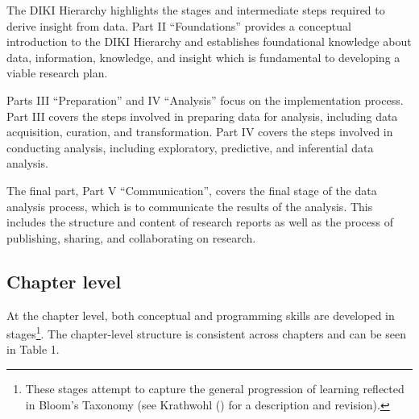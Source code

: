 \documentclass[
  letterpaper,
]{latex/krantz}
\theoremstyle{definition}
\theoremstyle{remark}
\begin{document}
The DIKI Hierarchy highlights the stages and intermediate steps required
to derive insight from data. Part II ``Foundations'' provides a
conceptual introduction to the DIKI Hierarchy and establishes
foundational knowledge about data, information, knowledge, and insight
which is fundamental to developing a viable research plan.

Parts III ``Preparation'' and IV ``Analysis'' focus on the
implementation process. Part III covers the steps involved in preparing
data for analysis, including data acquisition, curation, and
transformation. Part IV covers the steps involved in conducting
analysis, including exploratory, predictive, and inferential data
analysis.

The final part, Part V ``Communication'', covers the final stage of the
data analysis process, which is to communicate the results of the
analysis. This includes the structure and content of research reports as
well as the process of publishing, sharing, and collaborating on
research.

\subsection*{Chapter level}\label{sec-p-structure-chapter}

At the chapter level, both conceptual and programming skills are
developed in stages\footnote{These stages attempt to capture the general
  progression of learning reflected in Bloom's Taxonomy (see Krathwohl
  () for a description and revision).}.
The chapter-level structure is consistent across chapters and can be
seen in Table 1.
\end{document}
